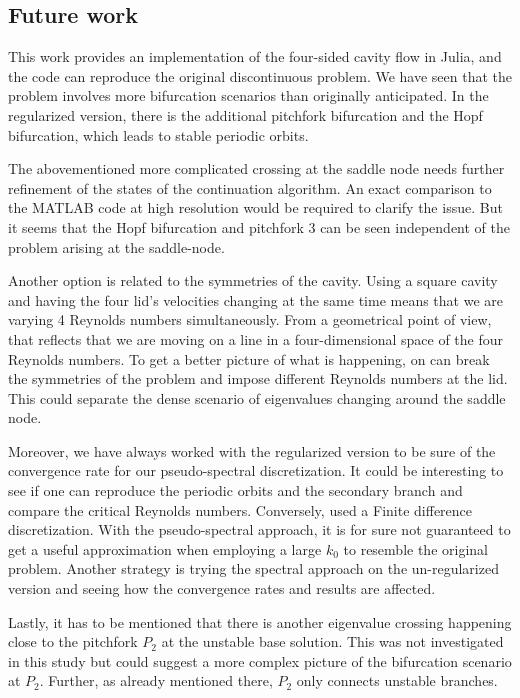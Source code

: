 \subsection{Future work}

This work provides an implementation of the four-sided cavity flow in Julia,
and the code can reproduce the original discontinuous problem. We have seen
that the problem involves more bifurcation scenarios than originally
anticipated. In the regularized version, there is the additional pitchfork
bifurcation and the Hopf bifurcation, which leads to stable periodic orbits.

The abovementioned more complicated crossing at the saddle node needs further
refinement of the states of the continuation algorithm. An exact comparison to
the MATLAB code at high resolution would be required to clarify the issue. But
it seems that the Hopf bifurcation and pitchfork $3$ can be seen independent of
the problem arising at the saddle-node. 

Another option is related to the symmetries of the cavity. Using a square
cavity and having the four lid's velocities changing at the same time means
that we are varying 4 Reynolds numbers simultaneously. From a geometrical point
of view, that reflects that we are moving on a line in a four-dimensional space
of the four Reynolds numbers. To get a better picture of what is happening, on
can break the symmetries of the problem and impose different Reynolds numbers
at the lid. This could separate the dense scenario of eigenvalues changing
around the saddle node.

Moreover, we have always worked with the regularized version to be sure of the
convergence rate for our pseudo-spectral discretization. It could be
interesting to see if one can reproduce the periodic orbits and the secondary
branch and compare the critical Reynolds numbers. Conversely, \citet{chen2013}
used a Finite difference discretization. With the pseudo-spectral approach, it
is for sure not guaranteed to get a useful approximation when employing a large
$k_0$ to resemble the original problem. Another strategy is trying the spectral
approach on the un-regularized version and seeing how the convergence rates and
results are affected.

Lastly, it has to be mentioned that there is another eigenvalue crossing
happening close to the pitchfork $P_2$ at the unstable base solution. This was
not investigated in this study but could suggest a more complex picture of the
bifurcation scenario at $P_2$. Further, as already mentioned there, $P_2$ only
connects unstable branches.


